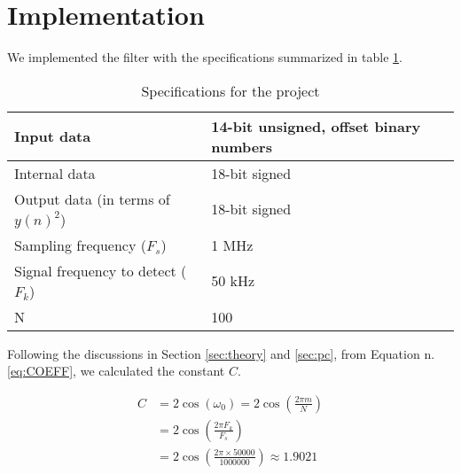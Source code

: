 \section{Implementation}\label{sec:implementation}

We implemented the filter with the specifications summarized in table \ref{tab:specifications}. \\

\begin{table}[ht]
\centering
\begin{tabular}{|l|l|}
\hline
Input data                  & 14-bit unsigned, offset binary numbers  \\ \hline
Internal data               & 18-bit signed                      \\ \hline
Output data (in terms of $y(n)^2$) & 18-bit signed                \\ \hline
Sampling frequency ($F_s$)  & 1 MHz                              \\ \hline
Signal frequency to detect ($F_k$) & 50 kHz                             \\ \hline
N                           & 100                                \\ \hline
\end{tabular}
\caption{Specifications for the project}
\label{tab:specifications}
\end{table}

Following the discussions in Section \ref{sec:theory} and \ref{sec:pc}, from Equation n.\ref{eq:COEFF}, we calculated the constant $C$.

\begin{align*}
C &= 2\cos(\omega_0) = 2\cos\left(\frac{2\pi m}{N}\right) \\
&= 2\cos\left(\frac{2\pi F_k}{F_s}\right) \\
&= 2\cos\left(\frac{2\pi \times 50000}{1000000}\right) \approx 1.9021
\end{align*}

